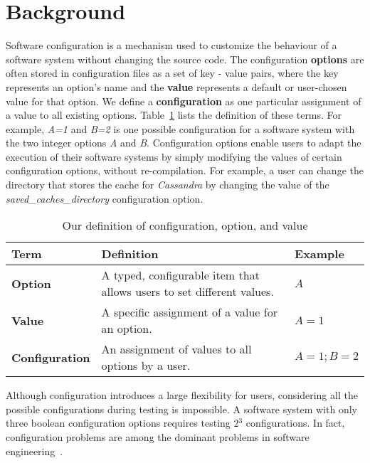 
\section{Background}
\label{sec:back}



Software configuration is a mechanism used to customize the behaviour of a software system without changing the source code. The configuration \textbf{options} are often stored in configuration files as a set of key - value pairs, where the key represents an option's name and the \textbf{value} represents a default or user-chosen value for that option. We define a \textbf{configuration} as one particular assignment of a value to all existing options. Table~\ref{tab:terms} lists the definition of these terms. For example, \emph{A=1} and \emph{B=2} is one possible configuration for a software system with the two integer options \emph{A} and \emph{B}. Configuration options enable users to adapt the execution of their software systems by simply modifying the values of certain configuration options, without re-compilation. For example, a user can change the directory that stores the cache for \emph{Cassandra} by changing the value of the \textit{saved\_caches\_directory} configuration option.%

\begin{table}[t]
    \centering
    \caption{Our definition of configuration, option, and value}
    \begin{tabular}{l|p{6.6cm}|l}
        \hline
        Term & Definition & Example \\
        \hline
        \textbf{Option}  & A typed, configurable item that allows users to set different values. & $A$ \\
        \textbf{Value} & A specific assignment of a value for an option. & $A = 1$ \\
        \textbf{Configuration} & An assignment of values to all options by a user. & $A = 1; B = 2$ \\
        \hline
    \end{tabular}
    \label{tab:terms}
\end{table}


Although configuration introduces a large flexibility for users, considering all the possible configurations during testing is impossible. A software system with only three boolean configuration options requires testing 2${^3}$ configurations. In fact, configuration problems are among the dominant %
problems in software engineering~\cite{tse,RN2897}.


